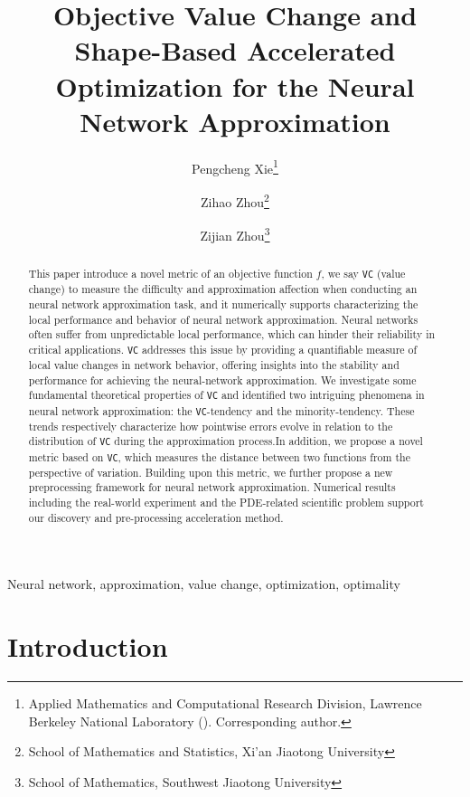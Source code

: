 \documentclass[final]{siamart220329}
\title{{Objective Value Change and Shape-Based Accelerated Optimization for the Neural Network Approximation}}
\author{
Pengcheng Xie\thanks{Applied Mathematics and Computational Research Division, Lawrence Berkeley National Laboratory (\email{pxie@lbl.gov}). Corresponding author.} 
\and Zihao Zhou\thanks{School of Mathematics and Statistics, Xi'an Jiaotong University} 
\and Zijian Zhou\thanks{School of Mathematics,  Southwest Jiaotong University}
}
\newtheorem{theoretical insights}{Theoretical insights}
\newtheorem{practical takeaway}{Practical takeaway}
\begin{document}
\maketitle

\begin{abstract}  
This paper introduce a novel metric of an objective function \(f\), we say \texttt{VC} (value change) to measure the difficulty and approximation affection when conducting an neural network approximation task, and it numerically supports characterizing the local performance and behavior of neural network approximation. Neural networks often suffer from unpredictable local performance, which can hinder their reliability in critical applications. \texttt{VC} addresses this issue by providing a quantifiable measure of local value changes in network behavior, offering insights into the stability and performance for achieving the neural-network approximation. We investigate some fundamental theoretical properties of \texttt{VC} and identified two intriguing phenomena in neural network approximation: the \texttt{VC}-tendency and the minority-tendency. These trends respectively characterize how pointwise errors evolve in relation to the distribution of \texttt{VC} during the approximation process.In addition, we propose a novel metric based on \texttt{VC}, which measures the distance between two functions from the perspective of variation. Building upon this metric, we further propose a new preprocessing framework for neural network approximation. Numerical results including the real-world experiment and the PDE-related scientific problem support our discovery and pre-processing acceleration method.  


 

\end{abstract}

\begin{keywords}
Neural network, approximation, value change, optimization, optimality
\end{keywords}



\setcounter{tocdepth}{3} 
\tableofcontents 


\section{Introduction}
 
\end{document}
